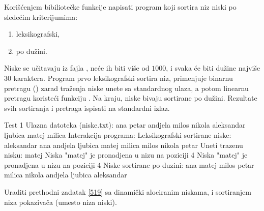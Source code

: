 \begin{Answer}[ref=518]
\end{Answer}
\begin{Exercise}[label=519]
   Korišćenjem bibiliotečke funkcije  napisati program
   koji sortira niz niski po sledećim kriterijumima:
   \begin{enumerate}
   \item leksikografski,
   \item po dužini.
   \end{enumerate}
   Niske se učitavaju iz fajla , neće ih biti više od
   $1000$, i svaka će biti dužine najviše $30$ karaktera. Program prvo
   leksikografski sortira niz, primenjuje binarnu pretragu
   () zarad traženja niske unete sa standardnog ulaza,
   a potom linearnu pretragu koristeći funkciju . Na
   kraju, niske bivaju sortirane po dužini. Rezultate svih sortiranja
   i pretraga ispisati na standardni izlaz.
   
\begin{maxitest}
\begin{test}{Test 1}
Ulazna datoteka (niske.txt):
  ana petar andjela milos nikola aleksandar ljubica matej milica
Interakcija programa:
  Leksikografski sortirane niske:
  aleksandar ana andjela ljubica matej milica milos nikola petar 
  Uneti trazenu nisku: matej
  Niska "matej" je pronadjena u nizu na poziciji 4
  Niska "matej" je pronadjena u nizu na poziciji 4
  Niske sortirane po duzini:
  ana matej milos petar milica nikola andjela ljubica aleksandar
\end{test}
\end{maxitest}
  
\end{Exercise}

\begin{Answer}[ref=519]
\end{Answer}
\begin{Exercise}[label=520]
  Uraditi prethodni zadatak \ref{519} sa dinamički alociranim niskama,
  i sortiranjem niza pokazivača (umesto niza niski).
  
\end{Exercise}

